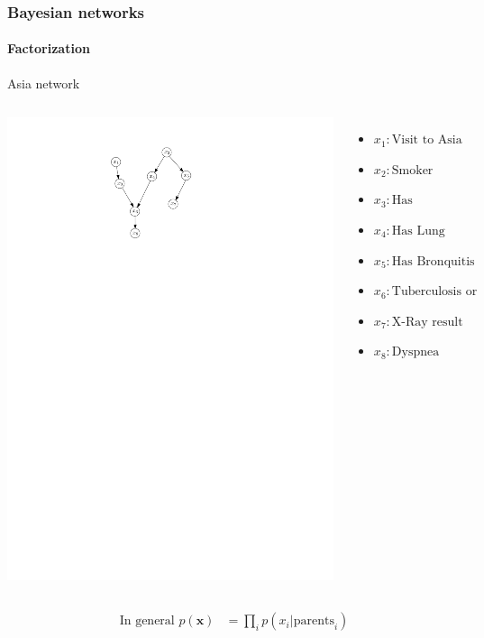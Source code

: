 \documentclass[slidestop,compress,mathserif]{beamer}
\newcommand{\bi}{\begin{itemize}}
\newcommand{\ei}{\end{itemize}}
\begin{document}
\begin{frame}
	\frametitle{Bayesian networks}
	\framesubtitle{Factorization}
    \begin{description}
    \item[Asia network]
    \end{description}
    \begin{columns}
    \begin{center}
    \includegraphics[width=.7\textwidth]{asia}%
    \end{center}
    \bi
     \item $x_1: \text{Visit to Asia}$
     \item  $x_2: \text{Smoker}$
     \item  $x_3: \text{Has Tuberculosis}$
     \item  $x_4: \text{Has Lung Cancer}$
     \item  $x_5: \text{Has Bronquitis}$
     \item  $x_6: \text{Tuberculosis or Cancer}$
     \item  $x_7: \text{X-Ray result}$
     \item  $x_8: \text{Dyspnea}$
    \ei
         \end{columns}
         \begin{align*}
         \text{In general } p(\mathbf{x}) & = \prod_i p(x_i|\text{parents}_{i})
         \end{align*}
\end{frame}
\end{document}
